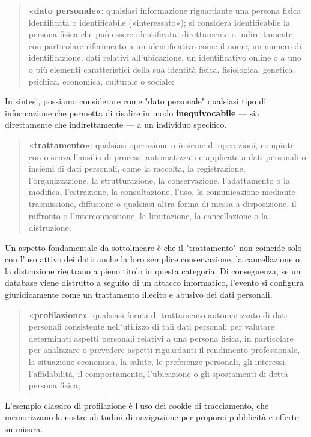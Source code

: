 \begin{quote}
    \textbf{«dato personale»}: qualsiasi informazione riguardante una persona fisica identificata o identificabile («interessato»); si considera identificabile la persona fisica che può essere identificata, direttamente o indirettamente, con particolare riferimento a un identificativo come il nome, un numero di identificazione, dati relativi all'ubicazione, un identificativo online o a uno o più elementi caratteristici della sua identità fisica, fisiologica, genetica, psichica, economica, culturale o sociale;
\end{quote}
In sintesi, possiamo considerare come "dato personale" qualsiasi tipo di informazione che permetta di risalire in modo \textbf{inequivocabile} — sia direttamente che indirettamente — a un individuo specifico.
\begin{quote}
    \textbf{«trattamento»}: qualsiasi operazione o insieme di operazioni, compiute con o senza l'ausilio di processi automatizzati e applicate a dati personali o insiemi di dati personali, come la raccolta, la registrazione, l'organizzazione, la strutturazione, la conservazione, l'adattamento o la modifica, l'estrazione, la consultazione, l'uso, la comunicazione mediante trasmissione, diffusione o qualsiasi altra forma di messa a disposizione, il raffronto o l'interconnessione, la limitazione, la cancellazione o la distruzione;
\end{quote}
Un aspetto fondamentale da sottolineare è che il "trattamento" non coincide solo con l'uso attivo dei dati: anche la loro semplice conservazione, la cancellazione o la distruzione rientrano a pieno titolo in questa categoria. Di conseguenza, se un database viene distrutto a seguito di un attacco informatico, l'evento si configura giuridicamente come un trattamento illecito e abusivo dei dati personali.
\begin{quote}
    \textbf{«profilazione»}: qualsiasi forma di trattamento automatizzato di dati personali consistente nell'utilizzo di tali dati personali per valutare determinati aspetti personali relativi a una persona fisica, in particolare per analizzare o prevedere aspetti riguardanti il rendimento professionale, la situazione economica, la salute, le preferenze personali, gli interessi, l'affidabilità, il comportamento, l'ubicazione o gli spostamenti di detta persona fisica;
\end{quote}
L'esempio classico di profilazione è l'uso dei cookie di tracciamento, che memorizzano le nostre abitudini di navigazione per proporci pubblicità e offerte su misura.
